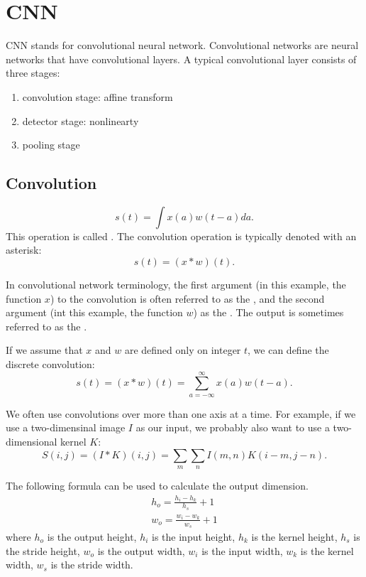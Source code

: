
\chapter{CNN}

CNN stands for convolutional neural network.
Convolutional networks are neural networks that have convolutional layers.
A typical convolutional layer consists of three stages:
\begin{enumerate}
\item convolution stage: affine transform
\item detector stage: nonlinearty
\item pooling stage
\end{enumerate}

\section{Convolution}

\begin{equation}
  \label{eq:convolution}
  s(t) = \int x(a)w(t-a)da.
\end{equation}
This operation is called .
The convolution operation is typically denoted with an asterisk:
\begin{equation}
  s(t) = (x*w)(t).
\end{equation}

In convolutional network terminology, the first argument (in this example, the function $x$) to the convolution is often referred to as the , and the second argument (int this example, the function $w$) as the .
The output is sometimes referred to as the .

If we assume that $x$ and $w$ are defined only on integer $t$, we can define the discrete convolution:
\begin{equation}
  \label{eq:discrete-convolution}
  s(t) = (x*w)(t) = \sum_{a=-\infty}^{\infty} x(a)w(t-a).
\end{equation}

We often use convolutions over more than one axis at a time.
For example, if we use a two-dimensinal image $I$ as our input, we probably also want to use a two-dimensional kernel $K$:
\begin{equation}
  S(i,j) = (I*K)(i,j) = \sum_m\sum_n I(m,n)K(i-m,j-n).
\end{equation}


The following formula can be used to calculate the output dimension.
\begin{gather}
  h_{o} = \frac{h_{i} - h_{k}}{h_{s}} + 1\\
  w_{o} = \frac{w_{i} - w_{k}}{w_{s}} + 1
\end{gather}
where \(h_{o}\) is the output height, \(h_{i}\) is the input height, \(h_{k}\) is the kernel height, \(h_{s}\) is the stride height, \(w_{o}\) is the output width, \(w_{i}\) is the input width, \(w_{k}\) is the kernel width, \(w_{s}\) is the stride width.

